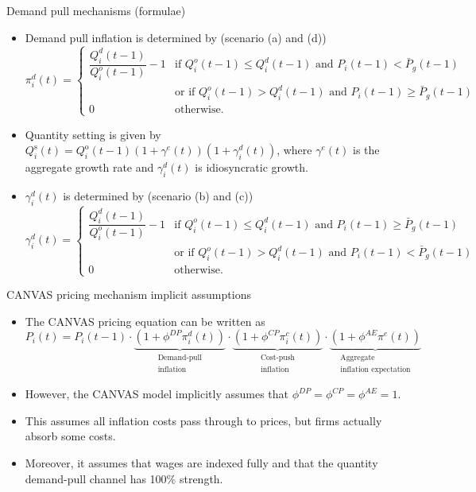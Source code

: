 \documentclass[9pt]{beamer}
\begin{document}
\begin{frame}{Demand pull mechanisms (formulae)}
    \begin{itemize}
        \item Demand pull inflation is determined by (scenario (a) and (d))
        \footnotesize
        \[ \pi_i^d(t)= \begin{cases}\dfrac{Q_i^d(t-1)}{Q_i^o(t-1)}-1 & \text{if } Q_i^o(t-1) \leq Q_i^d(t-1) \text{ and } P_i(t-1)<\bar{P}_g(t-1) \\ & \text{or if } Q_i^o(t-1)>Q_i^d(t-1) \text{ and } P_i(t-1) \geq \bar{P}_g(t-1) \\ 0 & \text{otherwise.}\end{cases} \]
        \item \normalsize Quantity setting is given by $Q_i^{\mathrm{s}}(t)=Q_i^{\mathrm{o}}(t-1)\left(1+\gamma^e(t)\right)\left(1+\gamma_i^d(t)\right)$, where $\gamma^e(t)$ is the aggregate growth rate and $\gamma_i^d(t)$ is idiosyncratic growth.
        \item $\gamma_i^d(t)$ is determined by (scenario (b) and (c))
        \footnotesize
        \[ \gamma_i^d(t)= \begin{cases}\dfrac{Q_i^d(t-1)}{Q_i^o(t-1)}-1 & \text{if } Q_i^o(t-1) \leq Q_i^d(t-1) \text{ and } P_i(t-1) \geq \bar{P}_g(t-1) \\ & \text{or if } Q_i^o(t-1)>Q_i^d(t-1) \text{ and } P_i(t-1)<\bar{P}_g(t-1) \\ 0 & \text{otherwise.}\end{cases} \]
    \end{itemize}
\end{frame}

\begin{frame}{CANVAS pricing mechanism implicit assumptions}
    \begin{itemize}
        \item The CANVAS pricing equation can be written as
        \[
        P_i(t)=P_i(t-1) \cdot \underbrace{\left(1+\phi^{DP}\pi_i^d(t)\right)}_{\substack{\text{Demand-pull}\\\text{inflation}}} \cdot \underbrace{\left(1+\phi^{CP}\pi_i^c(t)\right)}_{\substack{\text{Cost-push}\\\text{inflation}}} \cdot \underbrace{\left(1+\phi^{AE}\pi^e(t)\right)}_{\substack{\text{Aggregate}\\\text{inflation expectation}}}
        \]
        \item However, the CANVAS model implicitly assumes that $\phi^{DP}=\phi^{CP}=\phi^{AE}=1$.
        \item This assumes all inflation costs pass through to prices, but firms actually absorb some costs.
        \item Moreover, it assumes that wages are indexed fully and that the quantity demand-pull channel has 100\% strength.
    \end{itemize}
\end{frame}
\end{document}
